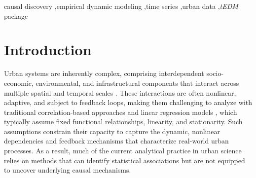 \documentclass[authoryear,preprint,review,12pt]{elsarticle}
\begin{document}
\begin{frontmatter}
\begin{abstract}
Urban systems are complex, nonlinear, and adaptive, with interactions unfolding across multiple spatial and temporal scales. Traditional correlation-based and regression approaches often fail to capture their dynamic causal structures, limiting understanding of underlying mechanisms. Causal inference provides a more powerful framework, encompassing both causal discovery and causal effect estimation, yet the former remains underexplored in urban studies. Empirical Dynamic Modeling (EDM) is well suited for this task, as it reconstructs system dynamics directly from time series without prespecified models. Despite its potential, EDM has seen limited application in urban contexts. To address this gap, we introduce \textit{tEDM}, an open-source R package that extends EDM to heterogeneous, high-frequency, multivariate, and multi-spatial urban datasets. The package combines a C++ computational backbone with seamless R integration to achieve both efficiency and usability in large-scale urban time series analysis. Its applicability is illustrated through representative case studies on environmental health, carbon–climate dynamics, and epidemic spread, demonstrating how \textit{tEDM} enables nuanced causal discovery and provides methodological as well as practical advances for urban and environmental research. The \textit{tEDM} package is publicly available at \url{https://github.com/stscl/tEDM}.
\end{abstract}

\begin{keyword}
causal discovery \sep empirical dynamic modeling \sep time series \sep urban data \sep \textit{tEDM} package
\end{keyword}
\end{frontmatter}

\linenumbers

\section{Introduction}\label{sec_intro}

Urban systems are inherently complex, comprising interdependent socio-economic, environmental, and infrastructural components that interact across multiple spatial and temporal scales \citep{mcphearson2016understand_urban_systems}. These interactions are often nonlinear, adaptive, and subject to feedback loops, making them challenging to analyze with traditional correlation-based approaches and linear regression models \citep{gan2025urban_transfer_entropy}, which typically assume fixed functional relationships, linearity, and stationarity. Such assumptions constrain their capacity to capture the dynamic, nonlinear dependencies and feedback mechanisms that characterize real-world urban processes. As a result, much of the current analytical practice in urban science relies on methods that can identify statistical associations but are not equipped to uncover underlying causal mechanisms.
\end{document}
